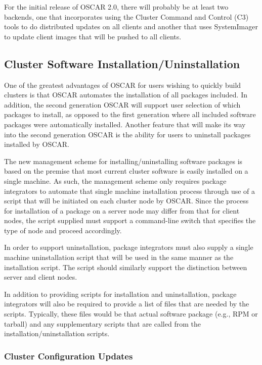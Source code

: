 For the initial release of OSCAR 2.0, there will probably be at least
two backends, one that incorporates using the Cluster Command and
Control (C3) tools to do distributed updates on all clients and
another that uses SystemImager to update client images that will be
pushed to all clients.

\subsection{Cluster Software Installation/Uninstallation}

One of the greatest advantages of OSCAR for users wishing to quickly
build clusters is that OSCAR automates the installation of all
packages included. In addition, the second generation OSCAR will
support user selection of which packages to install, as opposed to the
first generation where all included software packages were
automatically installed. Another feature that will make its way into
the second generation OSCAR is the ability for users to uninstall
packages installed by OSCAR.

The new management scheme for installing/uninstalling software
packages is based on the premise that most current cluster software is
easily installed on a single machine. As such, the management scheme
only requires package integrators to automate that single machine
installation process through use of a script that will be initiated on
each cluster node by OSCAR. Since the process for installation of a
package on a server node may differ from that for client nodes, the
script supplied must support a command-line switch that specifies the
type of node and proceed accordingly.

In order to support uninstallation, package integrators must also
supply a single machine uninstallation script that will be used in the
same manner as the installation script. The script should similarly
support the distinction between server and client nodes.

In addition to providing scripts for installation and uninstallation,
package integrators will also be required to provide a list of files
that are needed by the scripts.  Typically, these files would be that
actual software package (e.g., RPM or tarball) and any supplementary
scripts that are called from the installation/uninstallation scripts.

\subsubsection{Cluster Configuration Updates}

